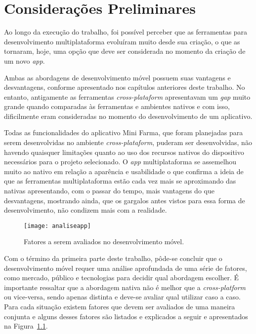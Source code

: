 \chapter{Considerações Preliminares} \label{cap:consideracoespreliminares}

Ao longo da execução do trabalho, foi possível perceber que as ferramentas para desenvolvimento multiplataforma 
evoluíram muito desde sua criação, o que as tornaram, hoje, uma opção que deve ser considerada no momento da criação de um novo \textit{app}.

Ambas as abordagens de desenvolvimento móvel possuem suas vantagens e desvantagens, conforme apresentado nos capítulos anteriores deste trabalho. 
No entanto, antigamente as ferramentas \textit{cross-plataform} apresentavam um \textit{gap} muito grande quando comparadas às ferramentas e ambientes nativos e com isso, 
dificilmente eram consideradas no momento do desenvolvimento de um aplicativo.

Todas as funcionalidades do aplicativo Mini Farma, que foram planejadas para serem desenvolvidas no ambiente \textit{cross-plataform}, puderam ser desenvolvidas, não havendo quaisquer limitações 
quanto ao uso dos recursos nativos do dispositivo necessários para o projeto selecionado. O \textit{app} multiplataforma se assemelhou muito 
ao nativo em relação a aparência e usabilidade o que confirma a ideia de que as ferramentas multiplataforma estão cada vez mais se aproximando
das nativas apresentando, com o passar do tempo, mais vantagens do que desvantagens, mostrando ainda, que os gargalos antes vistos para essa forma de desenvolvimento, não condizem
mais com a realidade.

\begin{figure}[H]
	\centering
	\texttt{[image: analiseapp]}
	\caption[Fatores a serem avaliados no desenvolvimento móvel]{ Fatores a serem avaliados no desenvolvimento móvel.}
	\label{fig:analiseapp}
\end{figure}

Com o término da primeira parte deste trabalho, pôde-se concluir que o desenvolvimento móvel requer uma análise aprofundada de uma série de fatores, 
como mercado, público e tecnologias para decidir qual abordagem escolher.
É importante ressaltar que a abordagem nativa não é melhor que a \textit{cross-platform} ou vice-versa, sendo apenas distinta e deve-se avaliar qual utilizar caso a 
caso. Para cada situação existem fatores que devem ser avaliados de uma maneira conjunta e alguns desses fatores são listados e explicados a seguir e apresentados na Figura~\ref{fig:analiseapp}.

